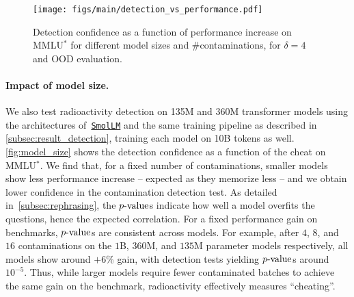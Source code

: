 \begin{wrapfigure}{r}{0.5\textwidth}
  \centering
  \vspace{-0.5cm}
\texttt{[image: figs/main/detection\_vs\_performance.pdf]} %
  \vspace{-0.25cm}
  \caption{Detection confidence as a function of performance increase on MMLU$^*$ for different model sizes and \#contaminations, for $\delta=4$ and OOD evaluation.}
  \vspace{-0.35cm}
\end{wrapfigure}\label{fig:model_size}
\paragraph{\textbf{Impact of model size.}}
We also test radioactivity detection on 135M and 360M transformer models using the architectures of~\href{https://github.com/huggingface/smollm}{\texttt{SmolLM}} and the same training pipeline as described in \autoref{subsec:result_detection}, training each model on 10B tokens as well. 
\autoref{fig:model_size} shows the detection confidence as a function of the cheat on MMLU$^*$.
We find that, for a fixed number of contaminations, smaller models show less performance increase -- expected as they memorize less -- and we obtain lower confidence in the contamination detection test. 
As detailed in~\autoref{subsec:rephrasing}, the $p\textrm{-value}$s indicate how well a model overfits the questions, hence the expected correlation. For a fixed performance gain on benchmarks, $p\textrm{-value}$s are consistent across models. For example, after $4$, $8$, and $16$ contaminations on the $1$B, $360$M, and $135$M parameter models respectively, all models show around $+6$\% gain, with detection tests yielding $p\textrm{-value}$s around $10^{-5}$.
Thus, while larger models require fewer contaminated batches to achieve the same gain on the benchmark, radioactivity effectively measures ``cheating''.






